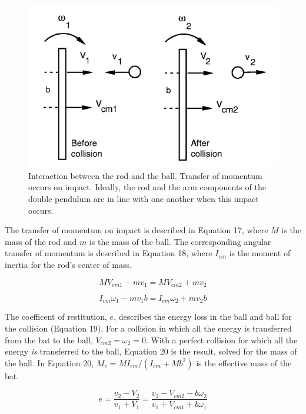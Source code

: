 \documentclass[%
 aip,
 amsmath,amssymb,
 reprint,%
 floatfix,%
]{revtex4-1}
\begin{document}
\begin{figure}[H]
	\centering
	\includegraphics[scale=0.4]{momentumtransfer.png}
	\caption{Interaction between the rod and the ball. Transfer of momentum occurs on impact. Ideally, the rod and the arm components of the double pendulum are in line with one another when this impact occurs.}
\end{figure}

The transfer of momentum on impact is described in Equation 17, where $M$ is the mass of the rod and $m$ is the mass of the ball. The corresponding angular transfer of momentum is described in Equation 18, where $I_{cm}$ is the moment of inertia for the rod's center of mass.

\begin{equation}
	M V_{cm1} - mv_1 = M V_{cm2} + mv_2
\end{equation}

\begin{equation}
	I_{cm} \omega_1 - mv_1b=I_{cm} \omega_2 + mv_2b
\end{equation}

The coefficent of restitution, $e$, describes the energy loss in the ball and ball for the collision (Equation 19). For a collision in which all the energy is transferred from the bat to the ball, $V_{cm2}=\omega_2=0$. With a perfect collision for which all the energy \textit{is} transferred to the ball, Equation 20 is the result, solved for the mass of the ball. In Equation 20, $M_e=MI_{cm}/(I_{cm} + Mb^2)$ is the effective mass of the bat.

\begin{equation}
	e=\frac{v_2 - V_2}{v_1 + V_1} = \frac{v_2 - V_{cm2} - b \omega_2}{v_1 + V_{cm1} + b \omega_1}
\end{equation}
\end{document}
